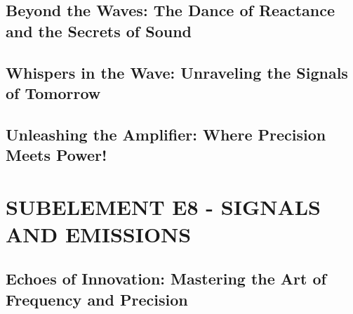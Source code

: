 \documentclass[12pt]{book}
\begin{document}
\section{Beyond the Waves: The Dance of Reactance and the Secrets of Sound}











\section{Whispers in the Wave: Unraveling the Signals of Tomorrow}














\section{Unleashing the Amplifier: Where Precision Meets Power!}












\chapter{SUBELEMENT E8 - SIGNALS AND EMISSIONS}
\section{Echoes of Innovation: Mastering the Art of Frequency and Precision}













\end{document}
